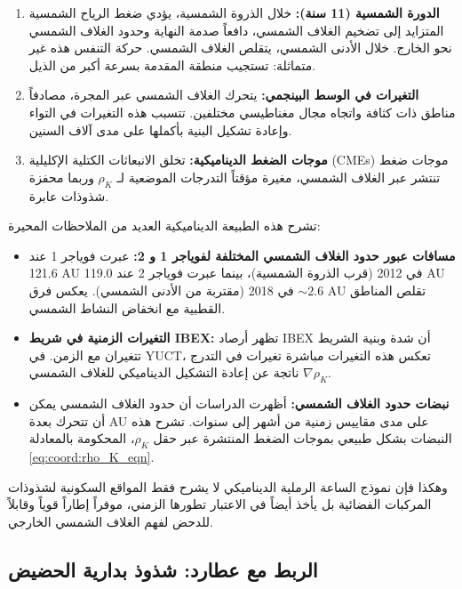 \documentclass[11pt,a4paper]{article}
\theoremstyle{remark}
\begin{document}
	\begin{enumerate}
		\item \textbf{الدورة الشمسية (11 سنة):} خلال الذروة الشمسية، يؤدي ضغط الرياح الشمسية المتزايد إلى تضخيم الغلاف الشمسي، دافعاً صدمة النهاية وحدود الغلاف الشمسي نحو الخارج. خلال الأدنى الشمسي، يتقلص الغلاف الشمسي. حركة التنفس هذه غير متماثلة: تستجيب منطقة المقدمة بسرعة أكبر من الذيل.
		
		\item \textbf{التغيرات في الوسط البينجمي:} يتحرك الغلاف الشمسي عبر المجرة، مصادفاً مناطق ذات كثافة واتجاه مجال مغناطيسي مختلفين. تتسبب هذه التغيرات في التواء وإعادة تشكيل البنية بأكملها على مدى آلاف السنين.
		
		\item \textbf{موجات الضغط الديناميكية:} تخلق الانبعاثات الكتلية الإكليلية (CMEs) موجات ضغط تنتشر عبر الغلاف الشمسي، مغيرة مؤقتاً التدرجات الموضعية لـ $\rho_K$ وربما محفزة شذوذات عابرة.
	\end{enumerate}
	
	تشرح هذه الطبيعة الديناميكية العديد من الملاحظات المحيرة:
	\begin{itemize}
		\item \textbf{مسافات عبور حدود الغلاف الشمسي المختلفة لفوياجر 1 و 2:} عبرت فوياجر 1 عند 121.6 AU في 2012 (قرب الذروة الشمسية)، بينما عبرت فوياجر 2 عند 119.0 AU في 2018 (مقتربة من الأدنى الشمسي). يعكس فرق $\sim2.6$ AU تقلص المناطق القطبية مع انخفاض النشاط الشمسي.
		
		\item \textbf{التغيرات الزمنية في شريط IBEX:} تظهر أرصاد IBEX أن شدة وبنية الشريط تتغيران مع الزمن. في YUCT، تعكس هذه التغيرات مباشرة تغيرات في التدرج $\nabla \rho_K$ ناتجة عن إعادة التشكيل الديناميكي للغلاف الشمسي.
		
		\item \textbf{نبضات حدود الغلاف الشمسي:} أظهرت الدراسات أن حدود الغلاف الشمسي يمكن أن تتحرك بعدة AU على مدى مقاييس زمنية من أشهر إلى سنوات. تشرح هذه النبضات بشكل طبيعي بموجات الضغط المنتشرة عبر حقل $\rho_K$، المحكومة بالمعادلة \eqref{eq:coord:rho_K_eqn}.
	\end{itemize}
	
	وهكذا فإن نموذج الساعة الرملية الديناميكي لا يشرح فقط المواقع السكونية لشذوذات المركبات الفضائية بل يأخذ أيضاً في الاعتبار تطورها الزمني، موفراً إطاراً قوياً وقابلاً للدحض لفهم الغلاف الشمسي الخارجي.
	
	\subsection{الربط مع عطارد: شذوذ بدارية الحضيض}
	\label{subsec:coord:mercury}
	
\end{document}
